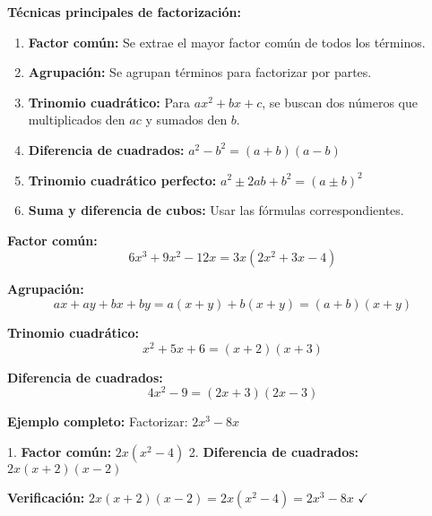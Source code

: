\begin{center}
\end{center}

\textbf{Técnicas principales de factorización:}

\begin{enumerate}
\item \textbf{Factor común:} Se extrae el mayor factor común de todos los términos.
\item \textbf{Agrupación:} Se agrupan términos para factorizar por partes.
\item \textbf{Trinomio cuadrático:} Para $ax^2 + bx + c$, se buscan dos números que multiplicados den $ac$ y sumados den $b$.
\item \textbf{Diferencia de cuadrados:} $a^2 - b^2 = (a + b)(a - b)$
\item \textbf{Trinomio cuadrático perfecto:} $a^2 \pm 2ab + b^2 = (a \pm b)^2$
\item \textbf{Suma y diferencia de cubos:} Usar las fórmulas correspondientes.
\end{enumerate}

\begin{example}
\textbf{Factor común:}
$$6x^3 + 9x^2 - 12x = 3x(2x^2 + 3x - 4)$$

\textbf{Agrupación:}
$$ax + ay + bx + by = a(x + y) + b(x + y) = (a + b)(x + y)$$

\textbf{Trinomio cuadrático:}
$$x^2 + 5x + 6 = (x + 2)(x + 3)$$

\textbf{Diferencia de cuadrados:}
$$4x^2 - 9 = (2x + 3)(2x - 3)$$

\textbf{Ejemplo completo:}
Factorizar: $2x^3 - 8x$

1. \textbf{Factor común:} $2x(x^2 - 4)$
2. \textbf{Diferencia de cuadrados:} $2x(x + 2)(x - 2)$

\textbf{Verificación:} $2x(x + 2)(x - 2) = 2x(x^2 - 4) = 2x^3 - 8x$ $\checkmark$
\end{example}

